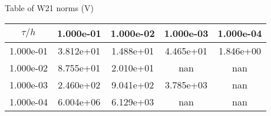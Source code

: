 \begin{center}
Table of W21 norms (V)
\\[2.0ex]  
  
\begin{tabular}{|c|c|c|c|c|} \hline
$\tau / h$ &1.000e-01 &1.000e-02 &1.000e-03 &1.000e-04 \\ \hline 
1.000e-01 &3.812e+01 &1.488e+01 &4.465e+01 &1.846e+00 \\ \hline 
1.000e-02 &8.755e+01 &2.010e+01 &nan &nan \\ \hline 
1.000e-03 &2.460e+02 &9.041e+02 &3.785e+03 &nan \\ \hline 
1.000e-04 &6.004e+06 &6.129e+03 &nan &nan \\ \hline 

\end{tabular}\\[20pt]
\end{center}
